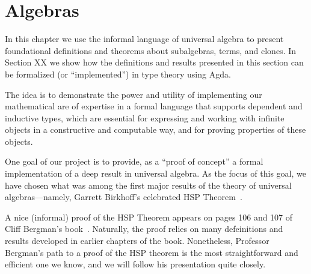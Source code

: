 \documentclass[sigplan,screen]{acmart}
\newcommand{\agdaualib}{\href{https://ualib.org}{agda-ualib}\xspace}
\begin{document}






\section{Algebras}\label{algebras}
In this chapter we use the informal language of universal algebra to present foundational definitions and theorems about subalgebras, terms, and clones. In Section XX we show how the definitions and results presented in this section can be formalized (or ``implemented'') in type theory using Agda.

The idea is to demonstrate the power and utility of implementing our mathematical are of expertise in a formal language that supports dependent and inductive types, which are essential for expressing and working with infinite objects in a constructive and computable way, and for proving properties of these objects.

One goal of our project is to provide, as a ``proof of concept'' a formal implementation of a deep result in universal algebra. As the focus of this goal, we have chosen what was among the first major results of the theory of universal algebras---namely, Garrett Birkhoff's celebrated HSP Theorem~\cite{Birkhoff:1935}.

A nice (informal) proof of the HSP Theorem appears on pages 106 and 107 of Cliff Bergman's book~\cite{Bergman:2012}. Naturally, the proof relies on many defeinitions and results developed in earlier chapters of the book. Nonetheless, Professor Bergman's path to a proof of the HSP theorem is the most straightforward and efficient one we know, and we will follow his presentation quite closely.
\end{document}
